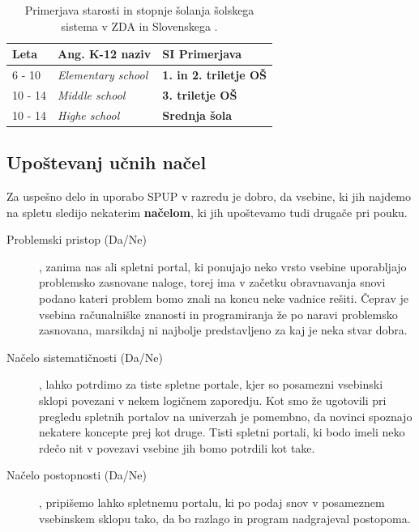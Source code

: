 \begin{table}[!h]
\caption{Primerjava starosti in stopnje šolanja šolskega sistema v ZDA
  in Slovenskega \cite{wiki:k12}.}
\label{tab:primerjava_šolski}
\begin{tabular}{
  | p{} |
  p{} |
  p{} |  }
\hline
  \rowcolor{sbase01!100}
  \textbf{Leta} & \textbf{Ang. K-12 naziv} & \textbf{SI Primerjava} \\
        \hline
      6 - 10    & \emph{Elementary school} & \textbf{1. in 2. triletje
                                             OŠ}\\
        \hline
      10 - 14    & \emph{Middle school} & \textbf{3. triletje OŠ} \\
        \hline
      10 - 14    & \emph{Highe school} & \textbf{Srednja šola} \\
  \hline
\end{tabular}
\end{table}

\subsection{Upoštevanj učnih načel}
\label{sec:upoštevanje_načel}

Za uspešno delo in uporabo SPUP v razredu je dobro, da vsebine, ki jih
najdemo na spletu sledijo nekaterim \textbf{načelom}, ki jih
upoštevamo tudi drugače pri pouku.


\begin{description}
\item[Problemski pristop (Da/Ne)], zanima nas ali spletni portal,
  ki ponujajo neko vrsto vsebine uporabljajo problemsko zasnovane
  naloge, torej ima v začetku obravnavanja snovi podano kateri problem
  bomo znali na koncu neke vadnice rešiti. Čeprav je vsebina 
  računalniške znanosti in programiranja že po naravi problemsko
  zasnovana, marsikdaj ni najbolje predstavljeno za kaj je neka stvar
  dobra.
\item[Načelo sistematičnosti (Da/Ne)], lahko potrdimo za tiste
  spletne portale, kjer so posamezni vsebinski sklopi povezani v nekem
  logičnem zaporedju. Kot smo že ugotovili pri pregledu spletnih
  portalov na univerzah je pomembno, da novinci spoznajo nekatere
  koncepte prej kot druge. Tisti spletni portali, ki bodo imeli neko
  rdečo nit v povezavi vsebine jih bomo potrdili kot take.
\item[Načelo postopnosti (Da/Ne)], pripišemo lahko spletnemu portalu,
  ki po podaj snov v posameznem vsebinskem sklopu tako, da bo razlago
  in program nadgrajeval postopoma. 
\end{description}

